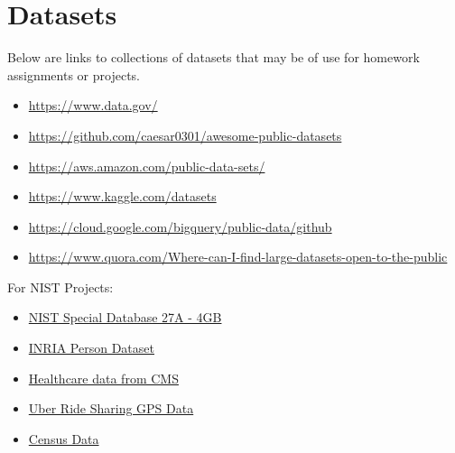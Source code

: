 \section{Datasets}\label{datasets}

Below are links to collections of datasets that may be of use for
homework assignments or projects.

\begin{itemize}

\item
  \url{https://www.data.gov/}
\item
  \url{https://github.com/caesar0301/awesome-public-datasets}
\item
  \url{https://aws.amazon.com/public-data-sets/}
\item
  \url{https://www.kaggle.com/datasets}
\item
  \url{https://cloud.google.com/bigquery/public-data/github}
\item
  \url{https://www.quora.com/Where-can-I-find-large-datasets-open-to-the-public}
\end{itemize}

For NIST Projects:

\begin{itemize}

\item
  \href{http://www.nist.gov/itl/iad/ig/sd27a.cfm}{NIST Special Database
  27A - 4GB}
\item
  \href{http://pascal.inrialpes.fr/data/human/}{INRIA Person Dataset}
\item
  \href{https://www.cms.gov/Research-Statistics-Data-and-Systems/Downloadable-Public-Use-Files/Part-B-National-Summary-Data-File/Overview.html}{Healthcare
  data from CMS}
\item
  \href{https://github.com/fivethirtyeight/uber-tlc-foil-response}{Uber
  Ride Sharing GPS Data}
\item
  \href{http://www.census.gov/population/www/cen2010/glance/}{Census
  Data}
\end{itemize}
